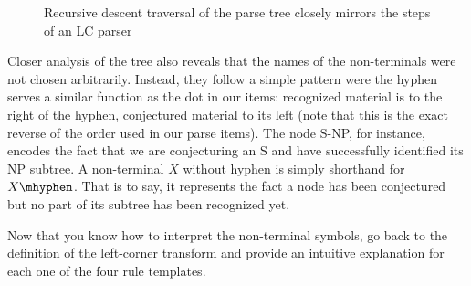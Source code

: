 \begin{figure}[tbph]
\caption{Recursive descent traversal of the parse tree closely mirrors the steps of an LC parser}
\label{fig:LC_AnnotatedTransformTree}
\end{figure}
%
Closer analysis of the tree also reveals that the names of the non-terminals were not chosen arbitrarily.
Instead, they follow a simple pattern were the hyphen serves a similar function as the dot in our items: recognized material is to the right of the hyphen, conjectured material to its left (note that this is the exact reverse of the order used in our parse items).
The node S-NP, for instance, encodes the fact that we are conjecturing an S and have successfully identified its NP subtree.
A non-terminal $X$ without hyphen is simply shorthand for $X\mhyphen$.
That is to say, it represents the fact a node has been conjectured but no part of its subtree has been recognized yet.
%
\begin{exercise}
    Now that you know how to interpret the non-terminal symbols, go back to the definition of the left-corner transform and provide an intuitive explanation for each one of the four rule templates.
\end{exercise}

